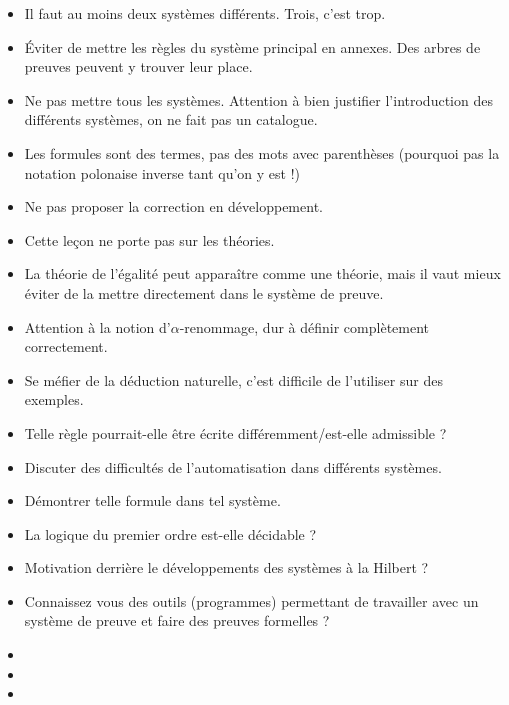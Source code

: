 \documentclass{agregfiche}
\begin{document}
\begin{itemize}
    \item Il faut au moins deux systèmes différents. Trois, c'est trop.
	\item Éviter de mettre les règles du système principal en annexes. Des arbres de preuves peuvent y trouver leur place.
	\item Ne pas mettre tous les systèmes. Attention à bien justifier l'introduction des différents systèmes, on ne fait pas un catalogue.
    \item Les formules sont des termes, pas des mots avec parenthèses (pourquoi pas la notation polonaise inverse tant qu'on y est !)
    \item Ne pas proposer la correction en développement.
	\item Cette leçon ne porte pas sur les théories.
    \item La théorie de l'égalité peut apparaître comme une théorie, mais il vaut mieux éviter de la mettre directement dans le système de preuve.
    \item Attention à la notion d'$\alpha$-renommage, dur à définir
    complètement correctement.
        \item Se méfier de la déduction naturelle, c'est difficile de
        l'utiliser sur des exemples.
\end{itemize}

\secquestionsclassiques

\begin{itemize}
    \item Telle règle pourrait-elle être écrite différemment/est-elle admissible ?
	\item Discuter des difficultés de l'automatisation dans
	différents systèmes.
	\item Démontrer telle formule dans tel système.
	\item La logique du premier ordre est-elle décidable ?
	\item Motivation derrière le développements des systèmes à la
	Hilbert ?
	\item Connaissez vous des outils (programmes) permettant de
	travailler avec un système de preuve et faire des preuves
	formelles ?

\end{itemize}

\secreferences

\begin{itemize}
\item 
\item 
\item 



\end{itemize}
\end{document}
